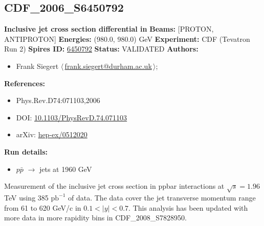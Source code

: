\subsection[CDF\_2006\_S6450792]{CDF\_2006\_S6450792\,\cite{Abulencia:2005yg}}
\textbf{Inclusive jet cross section differential in \pT}\newline
\textbf{Beams:} [PROTON, ANTIPROTON] \newline
\textbf{Energies:} (980.0, 980.0) GeV \newline
\textbf{Experiment:} CDF (Tevatron Run 2) \newline
\textbf{Spires ID:} \href{http://www.slac.stanford.edu/spires/find/hep/www?rawcmd=key+6450792}{6450792}\newline
\textbf{Status:} VALIDATED\newline
\textbf{Authors:}
\begin{itemize}
  \item Frank Siegert $\langle\,$\href{mailto:frank.siegert@durham.ac.uk}{frank.siegert@durham.ac.uk}$\,\rangle$;
\end{itemize}
\textbf{References:}
\begin{itemize}
  \item Phys.Rev.D74:071103,2006
  \item DOI: \href{http://dx.doi.org/10.1103/PhysRevD.74.071103}{10.1103/PhysRevD.74.071103}
  \item arXiv: \href{http://arxiv.org/abs/hep-ex/0512020}{hep-ex/0512020}
\end{itemize}
\textbf{Run details:}
\begin{itemize}

  \item $p\bar{p}$ \ensuremath{\to} jets at 1960 GeV\end{itemize}

\noindent Measurement of the inclusive jet cross section in ppbar interactions at $\sqrt{s}=1.96$ TeV using 385 $\mathrm{pb}^{-1}$ of data. The data cover the jet transverse momentum range from 61 to 620 GeV/c in $0.1 < |y| < 0.7$. This analysis has been updated with more data in more rapidity bins in CDF_2008_S7828950.

\clearpage


\clearpage

